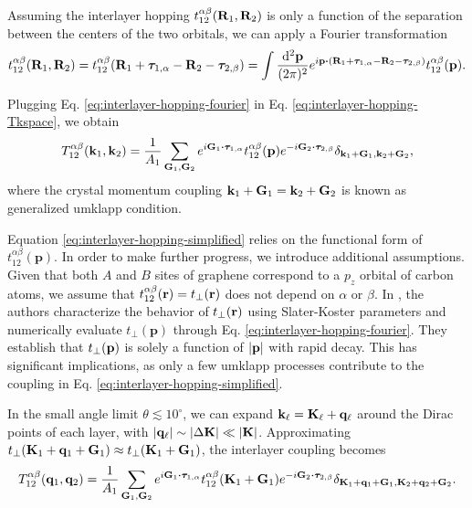 \documentclass[12pt]{report}
\begin{document}
Assuming the interlayer hopping $t_{12}^{\alpha\beta}(\vb{R}_1,\vb{R}_2)$ is only a function of the separation between the centers of the two orbitals, we can apply a Fourier transformation
\begin{equation} \label{eq:interlayer-hopping-fourier}
t_{12}^{\alpha\beta}(\R_1,\R_2) = t_{12}^{\alpha\beta}(\R_1+\vtau_{1,\alpha}-\R_2-\vtau_{2,\beta}) =
\int \frac{\dd[2]{\p}}{(2\pi)^2} e^{i \p \vdot (\R_1+\vtau_{1,\alpha}-\R_2-\vtau_{2,\beta})} t_{12}^{\alpha\beta}(\p).
\end{equation}

Plugging Eq. \eqref{eq:interlayer-hopping-fourier} in Eq. \eqref{eq:interlayer-hopping-Tkspace}, we obtain
\begin{equation} \label{eq:interlayer-hopping-simplified}
T_{12}^{\alpha\beta}(\k_1,\k_2) = \frac{1}{A_1}
\sum_{\G_1, \G_2} e^{i\G_1\vdot\vtau_{1,\alpha}} t_{12}^{\alpha\beta}(\p)
e^{-i\G_2\vdot\vtau_{2,\beta}} \delta_{\k_1+\G_1, \k_2+\G_2},
\end{equation}
where the crystal momentum coupling ${\vb{k}}_1 + {\vb{G}}_1 = {\vb{k}}_2 + {\vb{G}}_2$ is known as generalized umklapp condition.

\n

Equation \eqref{eq:interlayer-hopping-simplified} relies on the functional form of $t_{12}^{\alpha\beta}(\mathbf{p})$. In order to make further progress, we introduce additional assumptions. Given that both $A$ and $B$ sites of graphene correspond to a $p_z$ orbital of carbon atoms, we assume that $t_{12}^{\alpha\beta}({\vb{r}}) = t_\perp({\vb{r}})$ does not depend on $\alpha$ or $\beta$. In \cite{tperp-laissardiere2012}, the authors characterize the behavior of $t_\perp({\vb{r}})$ using Slater-Koster parameters and numerically evaluate $t_\perp(\mathbf{p})$ through Eq. \eqref{eq:interlayer-hopping-fourier}. They establish that $t_\perp({\vb{p}})$ is solely a function of $\abs{{\vb{p}}}$ with rapid decay. This has significant implications, as only a few umklapp processes contribute to the coupling in Eq. \eqref{eq:interlayer-hopping-simplified}.

\n

In the small angle limit $\theta \lesssim 10^\circ$, we can expand ${\vb{k}}_\ell = \vb{K}_\ell + {\vb{q}}_\ell$ around the Dirac points of each layer, with $\abs{{\vb{q}}_\ell} \sim \abs{\Delta \vb{K}} \ll \abs{\vb{K}}$. Approximating $t_\perp(\vb{K}_1+{\vb{q}}_1+{\vb{G}}_1) \approx t_\perp(\vb{K}_1+{\vb{G}}_1)$, the interlayer coupling becomes
\begin{equation} \label{eq:interlayer-hopping-truncation}
T_{12}^{\alpha\beta}(\q_1,\q_2) = \frac{1}{A_{1}} \sum_{\G_1,\G_2} e^{i\G_1\vdot\vtau_{1,\alpha}}
t_{12}^{\alpha\beta}(\K_1+\G_1) e^{-i\G_2\vdot\vtau_{2,\beta}}
\delta_{\K_1+\q_1+\G_1,\K_2+\q_2+\G_2}.
\end{equation}
\end{document}
